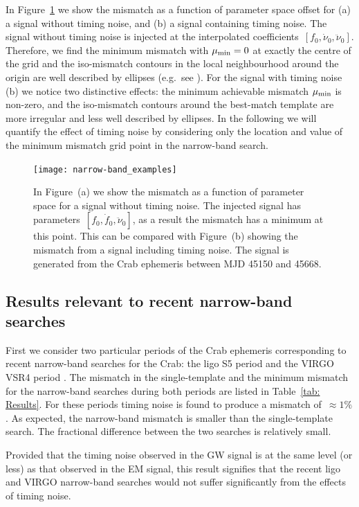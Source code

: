 \documentclass[../full_thesis/full_thesis.tex]{subfiles}
\begin{document}
In Figure~\ref{fig: narrow-band example} we show the mismatch as a function of
parameter space offset for (a) a signal without timing noise, and (b) a signal
containing timing noise. The signal without timing noise is injected at the
interpolated coefficients~$[f_{0}, \dot{\nu}_{0}, \ddot{\nu}_{0}]$.  Therefore, we find
the minimum mismatch with $\mu_{\mathrm{min}}=0$ at exactly the centre of the grid and the
iso-mismatch contours in the local neighbourhood around the origin are well
described by ellipses (e.g.\ see \citet{Prix2007}).  For the signal with timing
noise (b) we notice two distinctive effects: the minimum achievable mismatch
$\mu_{\mathrm{min}}$ is non-zero, and the iso-mismatch contours around the best-match
template are more irregular and less well described by ellipses.  In the
following we will quantify the effect of timing noise by considering only the
location and value of the minimum mismatch grid point in the narrow-band
search.
\begin{figure}[htb]
\centering
\texttt{[image: narrow-band\_examples]}
\caption{In Figure~(a) we show the mismatch as a function of parameter space
    for a signal without timing noise. The injected signal has
    parameters~$[f_{0}, \dot{f}_{0}, \ddot{\nu}_{0}]$, as a result the mismatch has
    a minimum at this point. This can be compared with Figure~(b) showing the
mismatch from a signal including timing noise. The signal is generated from the
Crab ephemeris between MJD 45150 and 45668.}
\label{fig: narrow-band example}
\end{figure}


\subsection{Results relevant to recent narrow-band searches}

First we consider two particular periods of the Crab ephemeris corresponding to
recent narrow-band searches for the Crab: the ligo S5 period \citep{ligo2008}
and the VIRGO VSR4 period \citep{ligo2015}. The mismatch in the single-template
and the minimum mismatch for the narrow-band searches during both periods are
listed in Table~\ref{tab: Results}. For these periods timing noise is
found to produce a mismatch of~$\approx 1\%$. As expected, the narrow-band
mismatch is smaller than the single-template search. The fractional difference
between the two searches is relatively small.

Provided that the timing noise observed in the GW signal is at the same level
(or less) as that observed in the EM signal, this result signifies that the
recent ligo and VIRGO narrow-band searches would not suffer significantly
from the effects of timing noise.
\end{document}
